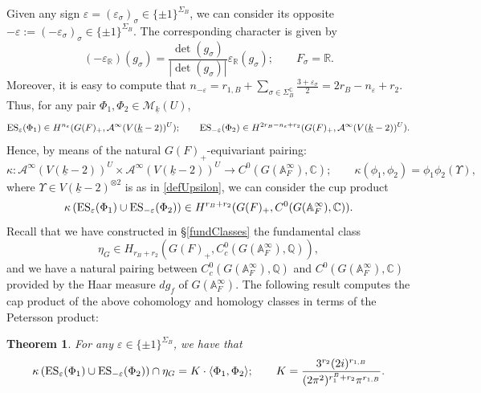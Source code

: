 \documentclass{amsart}
\newtheorem{theorem}{Theorem}[section]
\theoremstyle{definition}
\theoremstyle{remark}
\numberwithin{equation}{section}
\newcommand{\A}{{\mathbb A}}
\newcommand{\Q}{{\mathbb Q}}
\newcommand{\C}{{\mathbb C}}
\newcommand{\R}{{\mathbb R}}
\newcommand{\cA}{{\mathcal A}}
\newcommand{\cM}{{\mathcal M}}
\begin{document}
Given any sign $\varepsilon=(\varepsilon_\sigma)_\sigma\in \{\pm1\}^{\Sigma_B}$, we can consider its opposite $-\varepsilon:=(-\varepsilon_\sigma)_\sigma\in \{\pm1\}^{\Sigma_B}$. The corresponding character is given by
\[
(-\varepsilon_\R)(g_\sigma)=\frac{\det(g_\sigma)}{|\det(g_\sigma)|}\varepsilon_\R(g_\sigma);\qquad F_\sigma=\R.
\]
Moreover, it is easy to compute that 
$n_{-\varepsilon}=r_{1,B}+\sum_{\sigma\in\Sigma_B^\C}\frac{3+\varepsilon_\sigma}{2}=2r_B-n_\varepsilon+r_2$.
Thus, for any pair $\Phi_1,\Phi_2\in \cM_{\underline k}(U)$, 
\[
{\rm ES}_\varepsilon(\Phi_1)\in H^{n_\varepsilon}(G(F)_+,\cA^\infty(V(\underline k-2))^U);\qquad {\rm ES}_{-\varepsilon}(\Phi_2)\in H^{2r_B-n_\varepsilon+r_2}(G(F)_+,\cA^\infty(V(\underline k-2))^U).
\]
Hence, by means of the natural $G(F)_+$-equivariant pairing:
\[
\kappa:\cA^\infty(V(\underline k-2))^U\times \cA^\infty(V(\underline k-2))^U\longrightarrow C^0(G(\A_F^\infty),\C);\qquad \kappa(\phi_1,\phi_2)=\phi_1\phi_2(\Upsilon),
\]
where $\Upsilon\in V(\underline k-2)^{\otimes 2}$ is as in \eqref{defUpsilon}, we can consider the cup product
\[
\kappa\left({\rm ES}_\varepsilon(\Phi_1)\cup {\rm ES}_{-\varepsilon}(\Phi_2)\right)\in H^{r_B+r_2}(G(F)_+,C^0(G(\A_F^\infty),\C)).
\]
Recall that we have constructed in \S\ref{fundClasses} the fundamental class
\[
\eta_G\in H_{r_B+r_2}(G(F)_+,C_c^0(G(\A_F^\infty),\Q)),
\]
and we have a natural pairing between $C_c^0(G(\A_F^\infty),\Q)$ and $C^0(G(\A_F^\infty),\C)$ provided by the Haar measure $dg_f$ of $G(\A_F^\infty)$.
The following result computes the cap product of the above cohomology and homology classes in terms of the Petersson product:
\begin{theorem}
    For any $\varepsilon\in \{\pm1\}^{\Sigma_B}$, we have that 
    \[
    \kappa\left({\rm ES}_\varepsilon(\Phi_1)\cup {\rm ES}_{-\varepsilon}(\Phi_2)\right)\cap\eta_G=K\cdot\langle \Phi_1,\Phi_2\rangle;\qquad K=\frac{3^{r_2}(2i)^{r_{1,B}}}{(2\pi^2)^{r_1^B+r_2}\pi^{r_{1,B}}}.
    \]
\end{theorem}
\end{document}
